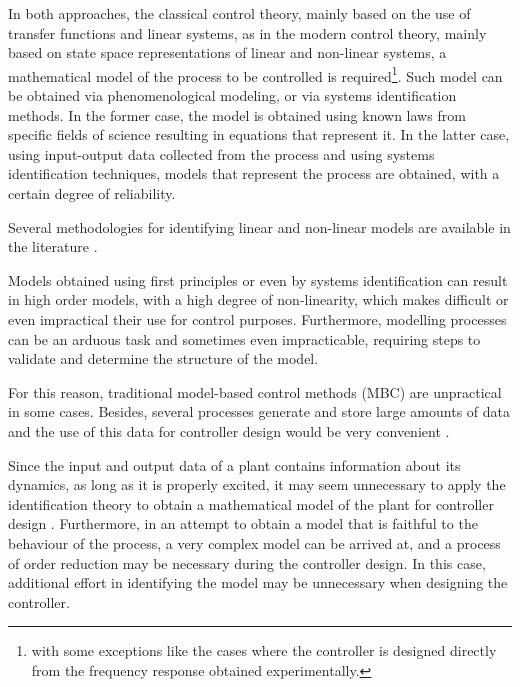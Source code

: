In both approaches, the classical control theory, mainly based on the use of transfer functions and linear systems, as in the modern control theory, mainly based on state space representations of linear and non-linear systems, a mathematical model of the process to be controlled is required\footnote{with some exceptions like the cases where the controller is designed directly from the frequency response obtained experimentally.}.
Such model can be obtained via phenomenological modeling, or via systems identification methods. In the former case, the model is obtained using known laws from specific fields of science resulting in equations that represent it. In the latter case, using input-output data collected from the process and using systems identification techniques, models that represent the process are obtained, with a certain degree of reliability.

Several methodologies for identifying linear and non-linear models are available in the literature \citep{aguirre2015, ljung1999}.

Models obtained using first principles or even by systems identification can result in high order models, with a high degree of non-linearity, which makes difficult or even impractical their use for control purposes.
Furthermore, modelling processes can be an arduous task and sometimes even impracticable, requiring steps to validate and determine the structure of the model. 

For this reason, traditional model-based control methods (MBC) are unpractical in some cases. Besides, several processes generate and store large amounts of data and the use of this data for controller design would be very convenient \citep{hou2013}.

Since the input and output data of a plant contains information about its dynamics, as long as it is properly excited, it may seem unnecessary to apply the identification theory to obtain a mathematical model of the plant for controller design \citep{ikeda2001}.
Furthermore, in an attempt to obtain a model that is faithful to the behaviour of the process, a very complex model can be arrived at, and a process of order reduction may be necessary during the controller design. In this case, additional effort in identifying the model may be unnecessary when designing the controller.

